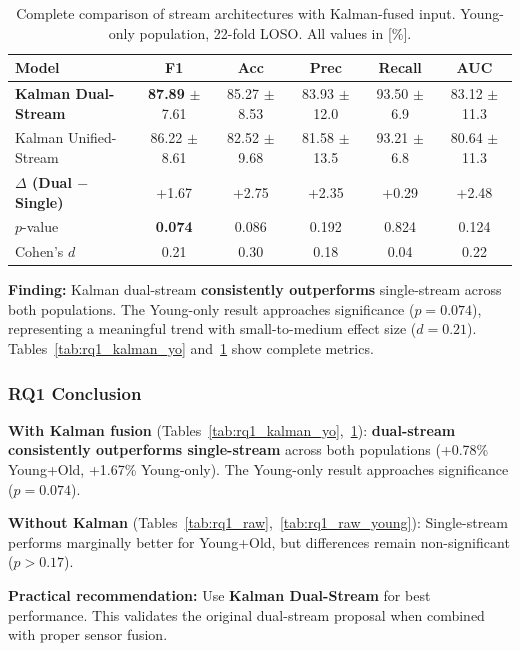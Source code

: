 \documentclass{article}
\begin{document}
\begin{table}[htbp]
    \centering
    \caption{Complete comparison of stream architectures with Kalman-fused input. Young-only population, 22-fold LOSO. All values in [\%].}
    \label{tab:rq1_kalman_young}
    \small
    \begin{tabular}{lccccc}
        \toprule
        \textbf{Model} & \textbf{F1} & \textbf{Acc} & \textbf{Prec} & \textbf{Recall} & \textbf{AUC} \\
        \midrule
        \textbf{Kalman Dual-Stream} & \textbf{87.89} $\pm$ 7.61 & 85.27 $\pm$ 8.53 & 83.93 $\pm$ 12.0 & 93.50 $\pm$ 6.9 & 83.12 $\pm$ 11.3 \\
        Kalman Unified-Stream & 86.22 $\pm$ 8.61 & 82.52 $\pm$ 9.68 & 81.58 $\pm$ 13.5 & 93.21 $\pm$ 6.8 & 80.64 $\pm$ 11.3 \\
        \midrule
        \textbf{$\Delta$ (Dual $-$ Single)} & +1.67 & +2.75 & +2.35 & +0.29 & +2.48 \\
        $p$-value & \textbf{0.074} & 0.086 & 0.192 & 0.824 & 0.124 \\
        Cohen's $d$ & 0.21 & 0.30 & 0.18 & 0.04 & 0.22 \\
        \bottomrule
    \end{tabular}
\end{table}

\textbf{Finding:} Kalman dual-stream \textbf{consistently outperforms} single-stream across both populations. The Young-only result approaches significance ($p = 0.074$), representing a meaningful trend with small-to-medium effect size ($d = 0.21$). Tables~\ref{tab:rq1_kalman_yo} and~\ref{tab:rq1_kalman_young} show complete metrics.

\subsubsection{RQ1 Conclusion}

\begin{tcolorbox}[colback=blue!5,colframe=blue!50!black,title=\textbf{Answer to RQ1: Single-Stream vs Dual-Stream}]
\textbf{With Kalman fusion} (Tables~\ref{tab:rq1_kalman_yo},~\ref{tab:rq1_kalman_young}): \textbf{dual-stream consistently outperforms single-stream} across both populations (+0.78\% Young+Old, +1.67\% Young-only). The Young-only result approaches significance ($p = 0.074$).

\textbf{Without Kalman} (Tables~\ref{tab:rq1_raw},~\ref{tab:rq1_raw_young}): Single-stream performs marginally better for Young+Old, but differences remain non-significant ($p > 0.17$).

\textbf{Practical recommendation:} Use \textbf{Kalman Dual-Stream} for best performance. This validates the original dual-stream proposal when combined with proper sensor fusion.
\end{tcolorbox}
\end{document}
